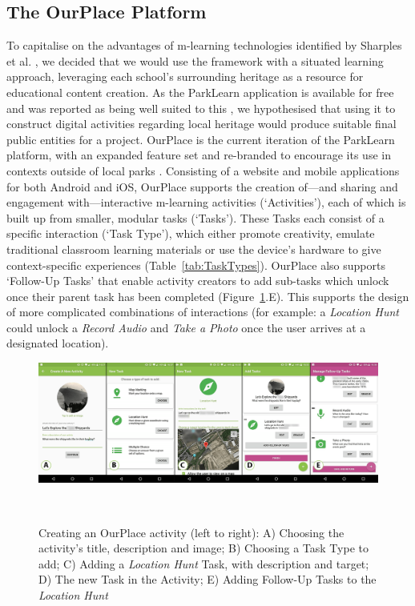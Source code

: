 \documentclass[,hyphens]{sigchi}
\begin{document}
\subsection{The OurPlace Platform}
To capitalise on the advantages of m-learning technologies identified by Sharples et al. \cite{Sharples2007}, we decided that we would use the framework with a situated learning approach,  leveraging each school's surrounding heritage as a resource for educational content creation. As the ParkLearn application is available for free and was reported as being well suited to this \cite{Richardson2018}, we hypothesised that using it to construct digital activities regarding local heritage would produce suitable final public entities for a project. OurPlace is the current iteration of the ParkLearn platform, with an expanded feature set and re-branded to encourage its use in contexts outside of local parks \cite{Richardson2018a}. Consisting of a website and mobile applications for both Android and iOS, OurPlace supports the creation of---and sharing and engagement with---interactive m-learning activities (`Activities'), each of which is built up from smaller, modular tasks (`Tasks'). These Tasks each consist of a specific interaction (`Task Type'), which either promote creativity, emulate traditional classroom learning materials or use the device's hardware to give context-specific experiences (Table~\ref{tab:TaskTypes}). OurPlace also supports `Follow-Up Tasks' that enable activity creators to add sub-tasks which unlock once their parent task has been completed (Figure~\ref{fig:ActivityCreation}.E). This supports the design of more complicated combinations of interactions (for example: a \textit{Location Hunt} could unlock a \textit{Record Audio} and \textit{Take a Photo} once the user arrives at a designated location).

\begin{figure}
  \centering
  \includegraphics[width=2.1\columnwidth]{figures/activityCreation}
  \caption{Creating an OurPlace activity (left to right): A) Choosing the activity's title, description and image; B) Choosing a Task Type to add; C) Adding a \textit{Location Hunt} Task, with description and target; D) The new Task in the Activity; E) Adding Follow-Up Tasks to the \textit{Location Hunt}  }~\label{fig:ActivityCreation}
  \vspace{-1.5em}
\end{figure}
\end{document}

